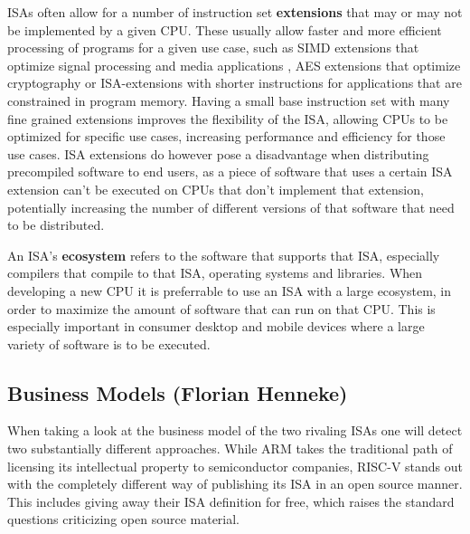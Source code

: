 \documentclass[conference]{IEEEtran}
\begin{document}
\glspl{ISA} often allow for a number of instruction set \textbf{extensions} that may or may not be implemented by a given \gls{CPU}. These usually allow
faster and more efficient processing of programs for a given use case, such as \gls{SIMD} extensions that optimize signal processing and media applications \cite[page 52]{Arm2020},
\gls{AES} extensions that optimize cryptography \cite{Arm2015} or \gls{ISA}-extensions with shorter instructions for applications that are constrained in program memory. \cite{Arm2005}
Having a small base instruction set with many fine grained extensions improves the flexibility of the \gls{ISA}, allowing \glspl{CPU} to be optimized for specific
use cases, increasing performance and efficiency for those use cases. \gls{ISA} extensions do however pose a disadvantage when distributing precompiled software
to end users, as a piece of software that uses a certain \gls{ISA} extension can't be executed on \glspl{CPU} that don't implement that extension, potentially
increasing the number of different versions of that software that need to be distributed.

An \gls{ISA}'s \textbf{ecosystem} refers to the software that supports that \gls{ISA}, especially compilers that compile to that \gls{ISA}, operating systems and libraries.
When developing a new \gls{CPU} it is preferrable to use an \gls{ISA} with a large ecosystem, in order to maximize the amount of software
that can run on that \gls{CPU}. This is especially important in consumer desktop and mobile devices where a large variety of software is to be executed.

	\subsection{Business Models (Florian Henneke)}
	\label{businessModels}
	When taking a look at the business model of the two rivaling \glspl{ISA} one will detect two substantially different approaches. While ARM takes the traditional path of licensing its intellectual property to semiconductor companies, RISC-V stands out with the completely different way of publishing its \gls{ISA} in an open source manner. This includes giving away their \gls{ISA} definition for free, which raises the standard questions criticizing open source material.
\end{document}
